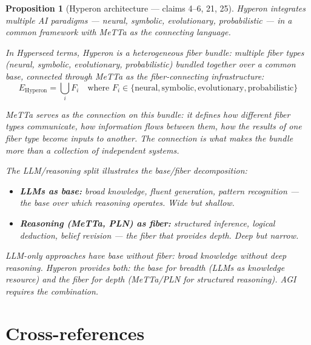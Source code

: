 \documentclass[11pt,a4paper]{article}
\newtheorem{proposition}[definition]{Proposition}
\begin{document}
\begin{proposition}[Hyperon architecture --- claims 4--6, 21, 25]
\label{prop:hyperon}
Hyperon integrates multiple AI paradigms --- neural, symbolic,
evolutionary, probabilistic --- in a common framework with MeTTa as
the connecting language.

In Hyperseed terms, Hyperon is a \emph{heterogeneous fiber bundle}:
multiple fiber types (neural, symbolic, evolutionary, probabilistic)
bundled together over a common base, connected through MeTTa as the
fiber-connecting infrastructure:
\[
  E_{\text{Hyperon}} = \bigcup_i F_i \quad \text{where } F_i \in
  \{\text{neural}, \text{symbolic}, \text{evolutionary},
  \text{probabilistic}\}
\]

MeTTa serves as the \emph{connection} on this bundle: it defines how
different fiber types communicate, how information flows between them,
how the results of one fiber type become inputs to another. The
connection is what makes the bundle more than a collection of
independent systems.

The LLM/reasoning split illustrates the base/fiber decomposition:
\begin{itemize}
\item \textbf{LLMs as base:} broad knowledge, fluent generation,
  pattern recognition --- the base over which reasoning operates.
  Wide but shallow.
\item \textbf{Reasoning (MeTTa, PLN) as fiber:} structured inference,
  logical deduction, belief revision --- the fiber that provides depth.
  Deep but narrow.
\end{itemize}

LLM-only approaches have base without fiber: broad knowledge without
deep reasoning. Hyperon provides both: the base for breadth (LLMs as
knowledge resource) and the fiber for depth (MeTTa/PLN for structured
reasoning). AGI requires the combination.
\end{proposition}


\section{Cross-references}
\end{document}
